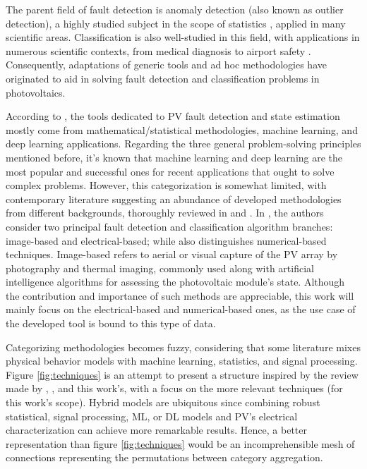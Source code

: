 The parent field of fault detection is anomaly detection (also known as outlier detection), a highly studied subject in the scope of statistics \cite{Prasad2009}, applied in many scientific areas. Classification is also well-studied in this field, with applications in numerous scientific contexts, from medical diagnosis to airport safety \cite{classification}. Consequently, adaptations of generic tools and ad hoc methodologies have originated to aid in solving fault detection and classification problems in photovoltaics.

According to \cite{AIPV}, the tools dedicated to PV fault detection and state estimation mostly come from mathematical/statistical methodologies, machine learning, and deep learning applications. Regarding the three general problem-solving principles mentioned before, it's known that machine learning and deep learning are the most popular and successful ones for recent applications that ought to solve complex problems. However, this categorization is somewhat limited, with contemporary literature suggesting an abundance of developed methodologies from different backgrounds, thoroughly reviewed in \cite{Hong2022} and \cite{Livera2019}. In \cite{Hong2022}, the authors consider two principal fault detection and classification algorithm branches: image-based and electrical-based; while \cite{Livera2019} also distinguishes numerical-based techniques. Image-based refers to aerial or visual capture of the PV array by photography and thermal imaging, commonly used along with artificial intelligence algorithms for assessing the photovoltaic module's state. Although the contribution and importance of such methods are appreciable, this work will mainly focus on the electrical-based and numerical-based ones, as the use case of the developed tool is bound to this type of data.

Categorizing methodologies becomes fuzzy, considering that some literature mixes physical behavior models with machine learning, statistics, and signal processing. Figure \ref{fig:techniques} is an attempt to present a structure inspired by the review made by \cite{Hong2022}, \cite{Livera2019}, and this work's, with a focus on the more relevant techniques (for this work's scope). Hybrid models are ubiquitous since combining robust statistical, signal processing, ML, or DL models and PV's electrical characterization can achieve more remarkable results. Hence, a better representation than figure \ref{fig:techniques} would be an incomprehensible mesh of connections representing the permutations between category aggregation.
 
